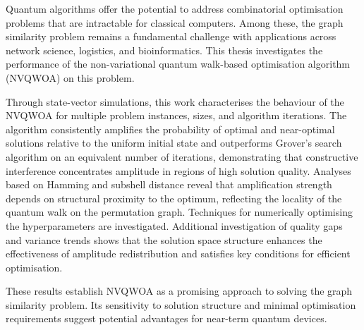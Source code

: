 Quantum algorithms offer the potential to address combinatorial optimisation problems that are intractable for classical computers. Among these, the graph similarity problem remains a fundamental challenge with applications across network science, logistics, and bioinformatics. This thesis investigates the performance of the non-variational quantum walk-based optimisation algorithm (NVQWOA) on this problem.

Through state-vector simulations, this work characterises the behaviour of the NVQWOA for multiple problem instances, sizes, and algorithm iterations. The algorithm consistently amplifies the probability of optimal and near-optimal solutions relative to the uniform initial state and outperforms Grover's search algorithm on an equivalent number of iterations, demonstrating that constructive interference concentrates amplitude in regions of high solution quality. Analyses based on Hamming and subshell distance reveal that amplification strength depends on structural proximity to the optimum, reflecting the locality of the quantum walk on the permutation graph. Techniques for numerically optimising the hyperparameters are investigated. Additional investigation of quality gaps and variance trends shows that the solution space structure enhances the effectiveness of amplitude redistribution and satisfies key conditions for efficient optimisation.

These results establish NVQWOA as a promising approach to solving the graph similarity problem. Its sensitivity to solution structure and minimal optimisation requirements suggest potential advantages for near-term quantum devices.